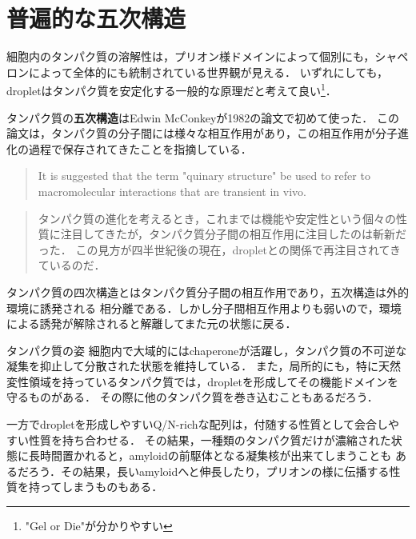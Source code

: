 \documentclass[uplatex, dvipdfmx]{jsreport}
\begin{document}
\section{普遍的な五次構造}

細胞内のタンパク質の溶解性は，プリオン様ドメインによって個別にも，シャペロンによって全体的にも統制されている世界観が見える．
いずれにしても，dropletはタンパク質を安定化する一般的な原理だと考えて良い\footnote{"Gel or Die"が分かりやすい}．

\begin{definition}[quinary]
    タンパク質の\textbf{五次構造}はEdwin McConkeyが1982の論文で初めて使った\cite{Molecular Evolution}．
    この論文は，タンパク質の分子間には様々な相互作用があり，この相互作用が分子進化の過程で保存されてきたことを指摘している．
    \begin{quote}
        It is suggested that the term "quinary structure" be used to refer to macromolecular interactions that are transient in vivo.\cite{Molecular Evolution}
    \end{quote}
    \begin{quote}
        タンパク質の進化を考えるとき，これまでは機能や安定性という個々の性質に注目してきたが，タンパク質分子間の相互作用に注目したのは斬新だった．
        この見方が四半世紀後の現在，dropletとの関係で再注目されてきているのだ．
    \end{quote}
\end{definition}
\begin{remark}
    タンパク質の四次構造とはタンパク質分子間の相互作用であり，五次構造は外的環境に誘発される
    相分離である．しかし分子間相互作用よりも弱いので，環境による誘発が解除されると解離してまた元の状態に戻る．
\end{remark}

\begin{itembox}[l]{タンパク質の姿}
    細胞内で大域的にはchaperoneが活躍し，タンパク質の不可逆な凝集を抑止して分散された状態を維持している．
    また，局所的にも，特に天然変性領域を持っているタンパク質では，dropletを形成してその機能ドメインを守るものがある．
    その際に他のタンパク質を巻き込むこともあるだろう．

    一方でdropletを形成しやすいQ/N-richな配列は，付随する性質として会合しやすい性質を持ち合わせる．
    その結果，一種類のタンパク質だけが濃縮された状態に長時間置かれると，amyloidの前駆体となる凝集核が出来てしまうことも
    あるだろう．その結果，長いamyloidへと伸長したり，プリオンの様に伝播する性質を持ってしまうものもある．
\end{itembox}
\end{document}
